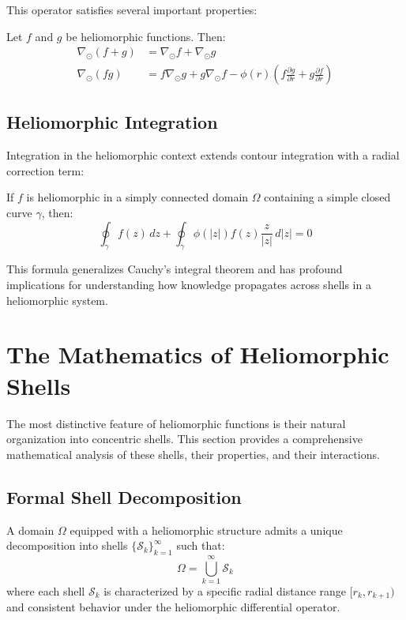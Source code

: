 This operator satisfies several important properties:

\begin{proposition}
Let $f$ and $g$ be heliomorphic functions. Then:
\begin{align}
\nabla_{\odot}(f + g) &= \nabla_{\odot}f + \nabla_{\odot}g \\
\nabla_{\odot}(fg) &= f\nabla_{\odot}g + g\nabla_{\odot}f - \phi(r)(f\frac{\partial g}{\partial r} + g\frac{\partial f}{\partial r})
\end{align}
\end{proposition}

\subsection{Heliomorphic Integration}

Integration in the heliomorphic context extends contour integration with a radial correction term:

\begin{theorem}
If $f$ is heliomorphic in a simply connected domain $\Omega$ containing a simple closed curve $\gamma$, then:
\begin{equation}
\oint_{\gamma} f(z) \, dz + \oint_{\gamma} \phi(|z|) f(z) \frac{z}{|z|} \, d|z| = 0
\end{equation}
\end{theorem}

This formula generalizes Cauchy's integral theorem and has profound implications for understanding how knowledge propagates across shells in a heliomorphic system.

\section{The Mathematics of Heliomorphic Shells}

The most distinctive feature of heliomorphic functions is their natural organization into concentric shells. This section provides a comprehensive mathematical analysis of these shells, their properties, and their interactions.

\subsection{Formal Shell Decomposition}

\begin{theorem}
A domain $\Omega$ equipped with a heliomorphic structure admits a unique decomposition into shells $\{\mathcal{S}_k\}_{k=1}^{\infty}$ such that:
\begin{equation}
\Omega = \bigcup_{k=1}^{\infty} \mathcal{S}_k
\end{equation}
where each shell $\mathcal{S}_k$ is characterized by a specific radial distance range $[r_k, r_{k+1})$ and consistent behavior under the heliomorphic differential operator.
\end{theorem}

